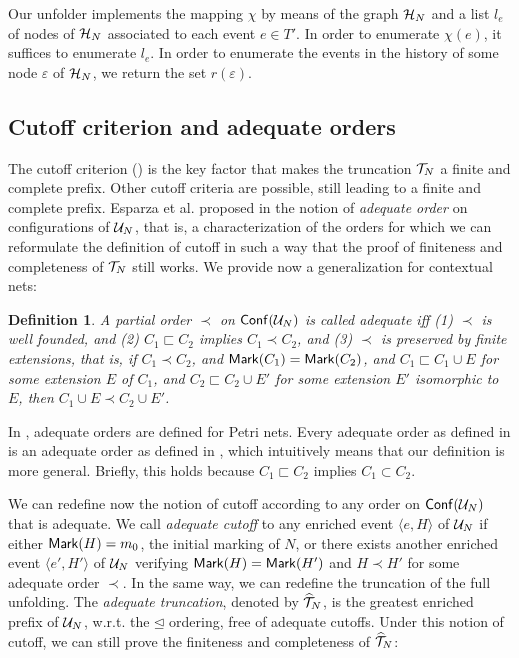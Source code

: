 \documentclass[11pt,a4paper]{article}
\newtheorem{definition}[theorem]{Definition}
\newcommand{\conf}[1]{\ensuremath{\mathsf{Conf}(#1)}}
\begin{document}
Our unfolder implements the mapping $\chi$ by means of the graph $\mathcal{H}_{N}$ and a
list $l_e$ of nodes of $\mathcal{H}_{N}$ associated to each event $e \in T'$.  In order
to enumerate $\chi (e)$, it suffices to enumerate $l_e$.  In order to enumerate
the events in the history of some node $\varepsilon$ of $\mathcal{H}_{N}$, we return the
set $r(\varepsilon)$.

\subsection{Cutoff criterion and adequate orders}
\label{sec:cutoff.criterion}

The cutoff criterion () is the key factor that makes the
truncation $\mathcal{T}_{N}$ a finite and complete prefix.  Other cutoff criteria are
possible, still leading to a finite and complete prefix.  Esparza et al.
proposed in  the notion of \emph{adequate order} on configurations
of $\mathcal{U}_{N}$, that is, a characterization of the orders for which we can
reformulate the definition of cutoff in such a way that the proof of finiteness
and completeness of $\mathcal{T}_{N}$ still works.  We provide now a generalization
for contextual nets:

\begin{definition}
\label{def:adequate.order}
A partial order $\prec$ on $\conf{\unf N}$ is called \emph{adequate} iff (1)
$\prec$ is well founded, and (2) $C_1 \sqsubset C_2$ implies $C_1 \prec C_2$,
and (3) $\prec$ is preserved by finite extensions, that is, if $C_1 \prec C_2$,
and $\mathsf{Mark }{(C_1)} = \mathsf{Mark }{(C_2)}$, and $C_1 \sqsubset C_1 \cup E$ for some
extension $E$ of $C_1$, and $C_2 \sqsubset C_2 \cup E'$ for some extension $E'$
isomorphic to $E$, then $C_1 \cup E \prec C_2 \cup E'$.
\end{definition}

In , adequate orders are defined for Petri nets.  Every adequate
order as defined in  is an adequate order as defined in
, which intuitively means that our definition is more
general.  Briefly, this holds because $C_1 \sqsubset C_2$ implies $C_1 \subset
C_2$.

We can redefine now the notion of cutoff according to any order on $\conf{\unf
N}$ that is adequate.  We call \emph{adequate cutoff} to any enriched event
$\langle e, H \rangle$ of $\mathcal{U}_{N}$  if either $\mathsf{Mark }{(H)} = m_0$, the initial
marking of $N$, or there exists another enriched event $\langle e', H' \rangle$
of $\mathcal{U}_{N}$ verifying $\mathsf{Mark }{(H)} = \mathsf{Mark }{(H')}$ and $H \prec H'$ for some
adequate order $\prec$.  In the same way, we can redefine the truncation of the
full unfolding.  The \emph{adequate truncation}, denoted by $\widehat{\mathcal{T}}_{N}$, is the
greatest enriched prefix of $\mathcal{U}_{N}$, w.r.t. the $\unlhd$ ordering, free of
adequate cutoffs.  Under this notion of cutoff, we can still prove the
finiteness and completeness of $\widehat{\mathcal{T}}_{N}$:
\end{document}

